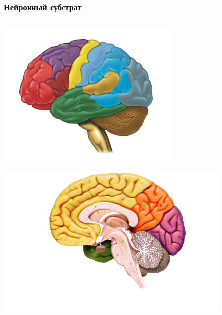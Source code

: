 \documentclass[default]{beamer}
\begin{document}
	\begin{frame}
		\frametitle{Нейронный субстрат}
		
		\begin{columns}
			\begin{column}{0.5\textwidth}
				\includegraphics[width=0.7\textwidth]{phisio/mozg_2}
				\par\bigskip
				\hspace{-7mm}\includegraphics[width=0.9\textwidth]{phisio/mozg}
			\end{column}
			\begin{column}{0.5\textwidth}

\end{column}
\end{columns}
\end{frame}
\end{document}
